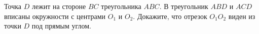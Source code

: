 \begin{ex}
	\begin{condition}
		Точка \( D  \) лежит на стороне \( BC  \) треугольника \( ABC \). В треугольник \( ABD  \) и \( ACD  \) вписаны окружности с центрами \( O_1 \) и \( O_2 \). Докажите, что отрезок \( O_1O_2  \) виден из точки \( D \)	под прямым углом.
	\end{condition}
\end{ex}
